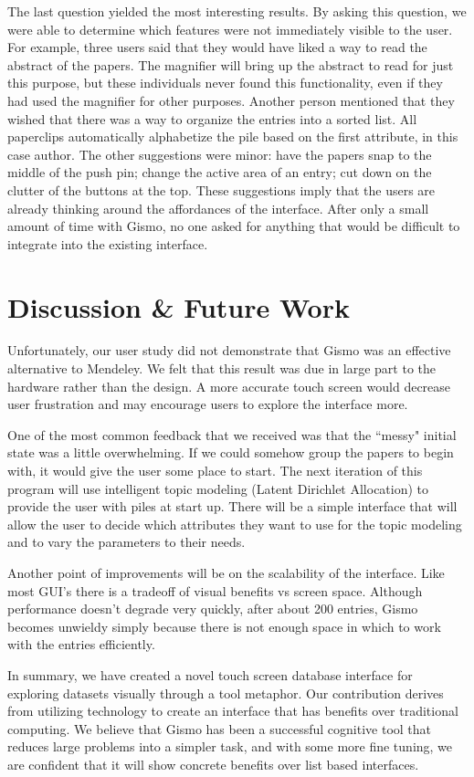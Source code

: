 \documentclass{article}
\begin{document}
	The last question yielded the most interesting results.  By asking this question, we were able to determine which features were not immediately visible to the user.  For example, three users said that they would have liked a way to read the abstract of the papers.  The magnifier will bring up the abstract to read for just this purpose, but these individuals never found this functionality, even if they had used the magnifier for other purposes.  Another person mentioned that they wished that there was a way to organize the entries into a sorted list.  All paperclips automatically alphabetize the pile based on the first attribute, in this case author.  The other suggestions were minor: have the papers snap to the middle of the push pin; change the active area of an entry; cut down on the clutter of the buttons at the top.  These suggestions imply that the users are already thinking around the affordances of the interface.  After only a small amount of time with Gismo, no one asked for anything that would be difficult to integrate into the existing interface.  


\section{Discussion \& Future Work}
Unfortunately, our user study did not demonstrate that Gismo was an effective alternative to Mendeley.  We felt that this result was due in large part to the hardware rather than the design.  A more accurate touch screen would decrease user frustration and may encourage users to explore the interface more.  

One of the most common feedback that we received was that the ``messy" initial state was a little overwhelming.  If we could somehow group the papers to begin with, it would give the user some place to start.  The next iteration of this program will use intelligent topic modeling (Latent Dirichlet Allocation) to provide the user with piles at start up.  There will be a simple interface that will allow the user to decide which attributes they want to use for the topic modeling and to vary the parameters to their needs.  

Another point of improvements will be on the scalability of the interface.  Like most GUI's there is a tradeoff of visual benefits vs screen space.  Although performance doesn't degrade very quickly, after about 200 entries, Gismo becomes unwieldy simply because there is not enough space in which to work with the entries efficiently.  

In summary, we have created a novel touch screen database interface for exploring datasets visually through a tool metaphor.  Our contribution derives from utilizing technology to create an interface that has benefits over traditional computing.  We believe that Gismo has been a successful cognitive tool that reduces large problems into a simpler task, and with some more fine tuning, we are confident that it will show concrete benefits over list based interfaces.  





%
{}
\end{document}
